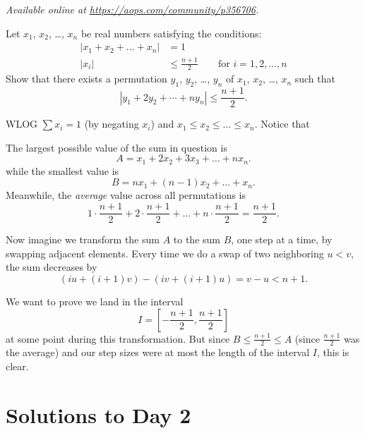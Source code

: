 \textsl{Available online at \url{https://aops.com/community/p356706}.}
\begin{mdframed}[style=mdpurplebox,frametitle={Problem statement}]
Let $x_1$, $x_2$, \dots, $x_n$ be real numbers satisfying the conditions:
\begin{align*}
  |x_1 + x_2 + \dots + x_n| &= 1 \\
  |x_i| &\le \frac{n+1}{2} \qquad \text{for } i= 1,2, \dots, n
\end{align*}
Show that there exists a permutation $y_1$, $y_2$, \dots, $y_n$
of $x_1$, $x_2$, \dots, $x_n$ such that
\[ | y_1 + 2 y_2 + \dotsb + n y_n | \leq \frac {n + 1}{2}. \]
\end{mdframed}
WLOG $\sum x_i = 1$ (by negating $x_i$) and $x_1 \le x_2 \le \dots \le x_n$.
Notice that
\begin{itemize}
\ii The largest possible value of the sum in question is
\[ A = x_1 + 2x_2 + 3x_3 + \dots + nx_n. \]
while the smallest value is
\[ B = nx_1 + (n-1)x_2 + \dots + x_n. \]
\ii Meanwhile, the \emph{average} value across all permutations is
\[ 1 \cdot \frac{n+1}{2} + 2 \cdot \frac{n+1}{2} + \dots
  + n \cdot \frac{n+1}{2} = \frac{n+1}{2}. \]
\end{itemize}

Now imagine we transform the sum $A$ to the sum $B$,
one step at a time, by swapping adjacent elements.
Every time we do a swap of two neighboring $u < v$, the sum decreases by
\[ (iu + (i+1)v) - (iv + (i+1)u) = v-u < n+1. \]

We want to prove we land in the interval
\[ I = \left[ -\frac{n+1}{2}, \frac{n+1}{2} \right] \]
at some point during this transformation.
But since $B \le \frac{n+1}{2} \le A$ (since $\frac{n+1}{2}$ was the average)
and our step sizes were at most the length of the interval $I$,
this is clear.
\pagebreak

\section{Solutions to Day 2}